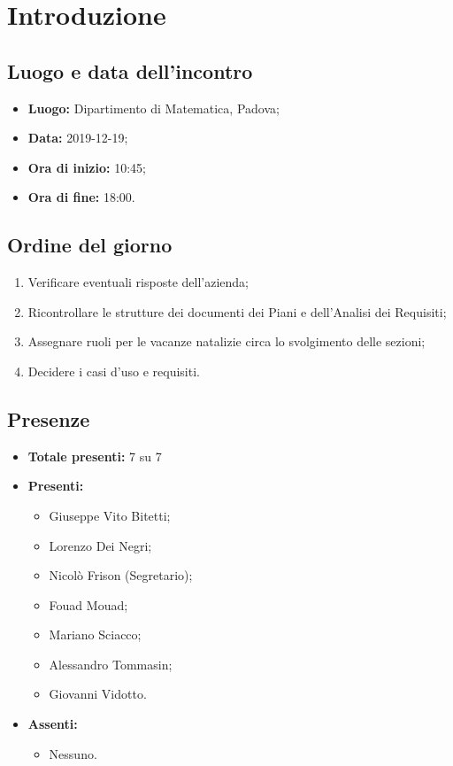 \section*{Introduzione}

\subsection*{Luogo e data dell'incontro}
	\begin{itemize}
		\item \textbf{Luogo:} Dipartimento di Matematica, Padova;
		\item \textbf{Data:} 2019-12-19;
		\item \textbf{Ora di inizio:} 10:45;
		\item \textbf{Ora di fine:} 18:00.
	\end{itemize}

\subsection*{Ordine del giorno}
	\begin{enumerate}
		\item Verificare eventuali risposte dell'azienda;
		\item  Ricontrollare le strutture dei documenti dei Piani e dell'Analisi dei Requisiti;
		\item  Assegnare ruoli per le vacanze natalizie circa lo svolgimento delle sezioni;
		\item  Decidere i casi d'uso e requisiti.
	\end{enumerate}

\subsection*{Presenze}
	\begin{itemize}
		\item \textbf{Totale presenti:} 7 su 7
		\item \textbf{Presenti: }
			\begin{itemize}			
				\item Giuseppe Vito Bitetti;
				\item Lorenzo Dei Negri;
				\item Nicolò Frison (Segretario);
				\item Fouad Mouad;
				\item Mariano Sciacco;
				\item Alessandro Tommasin;
				\item Giovanni Vidotto.
			\end{itemize}
		\item \textbf{Assenti: } 
			\begin{itemize}	
				\item Nessuno.
			\end{itemize}
	\end{itemize}



